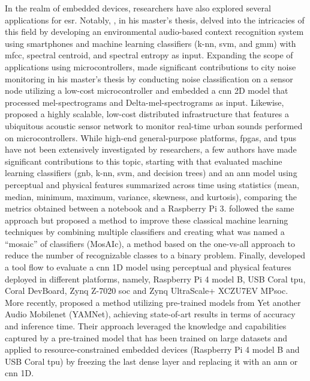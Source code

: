 In the realm of embedded devices, researchers have also explored several applications for \gls{esr}. Notably, \textcite{Abreha2014}, in his master's thesis, delved into the intricacies of this field by developing an environmental audio-based context recognition system using smartphones and machine learning classifiers (\gls{k-nn}, \gls{svm}, and \gls{gmm}) with \gls{mfcc}, spectral centroid, and spectral entropy as input. Expanding the scope of applications using microcontrollers, \textcite{Nordby2019} made significant contributions to city noise monitoring in his master’s thesis by conducting noise classification on a sensor node utilizing a low-cost microcontroller and embedded a \gls{cnn} 2D model that processed mel-spectrograms and Delta-mel-spectrograms as input. Likewise, \textcite{VidaaVila2020} proposed a highly scalable, low-cost distributed infrastructure that features a ubiquitous acoustic sensor network to monitor real-time urban sounds performed on microcontrollers. While high-end general-purpose platforms, \gls{fpga}s, and \gls{tpu}s have not been extensively investigated by researchers, a few authors have made significant contributions to this topic, starting with \textcite{Silva2019} that evaluated machine learning classifiers (\gls{gnb}, \gls{k-nn}, \gls{svm}, and decision trees) and an \gls{ann} model using perceptual and physical features summarized across time using statistics (mean, median, minimum, maximum, variance, skewness, and kurtosis), comparing the metrics obtained between a notebook and a Raspberry Pi 3. \textcite{Lhoest2021} followed the same approach but proposed a method to improve these classical machine learning techniques by combining multiple classifiers and creating what was named a “mosaic” of classifiers (MosAIc), a method based on the one-vs-all approach to reduce the number of recognizable classes to a binary problem. Finally, \textcite{Vandendriessche2021} developed a tool flow to evaluate a \gls{cnn} 1D model using perceptual and physical features deployed in different platforms, namely, Raspberry Pi 4 model B, USB Coral \gls{tpu}, Coral DevBoard, Zynq Z-7020 \gls{soc} and Zynq UltraScale+ XCZU7EV MP\gls{soc}. More recently, \textcite{Lamrini2023} proposed a method utilizing pre-trained models from Yet another Audio Mobilenet (YAMNet), achieving state-of-art results in terms of accuracy and inference time. Their approach leveraged the knowledge and capabilities captured by a pre-trained model that has been trained on large datasets and applied to resource-constrained embedded devices (Raspberry Pi 4 model B and USB Coral \gls{tpu}) by freezing the last dense layer and replacing it with an \gls{ann} or \gls{cnn} 1D. 

